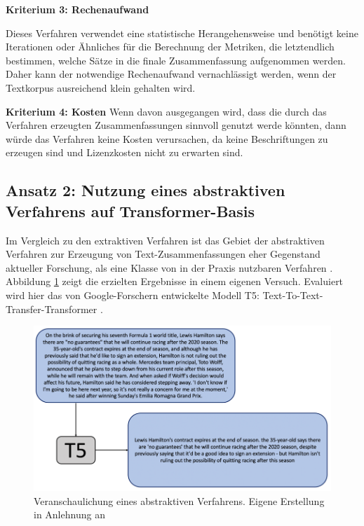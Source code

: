 {\bf Kriterium 3: Rechenaufwand}

Dieses Verfahren verwendet eine statistische Herangehensweise und benötigt keine Iterationen oder Ähnliches für die Berechnung der Metriken, die letztendlich bestimmen, welche Sätze in die finale Zusammenfassung aufgenommen werden. Daher kann der notwendige Rechenaufwand vernachlässigt werden, wenn der Textkorpus ausreichend klein gehalten wird.

{\bf Kriterium 4: Kosten}
Wenn davon ausgegangen wird, dass die durch das Verfahren erzeugten Zusammenfassungen sinnvoll genutzt werde könnten, dann würde das Verfahren keine Kosten verursachen, da keine Beschriftungen zu erzeugen sind und Lizenzkosten nicht zu erwarten sind.

\subsection{Ansatz 2: Nutzung eines abstraktiven Verfahrens auf Transformer-Basis}

Im Vergleich zu den extraktiven Verfahren ist das Gebiet der abstraktiven Verfahren zur Erzeugung von Text-Zusammenfassungen eher Gegenstand aktueller Forschung, als eine Klasse von in der Praxis nutzbaren Verfahren \cite[S. 261]{Gupta}. Abbildung \ref{Abbildung:t5} zeigt die erzielten Ergebnisse in einem eigenen Versuch. Evaluiert wird hier das von Google-Forschern entwickelte Modell T5: Text-To-Text-Transfer-Transformer \cite{Raffel}.

\begin{figure}[h]
\centering
\includegraphics[scale=0.95]{content/pics/Picture_22.png}
\caption{Veranschaulichung eines abstraktiven Verfahrens. Eigene Erstellung in Anlehnung an \cite{Raffel}}
\label{Abbildung:t5}
\end{figure}

